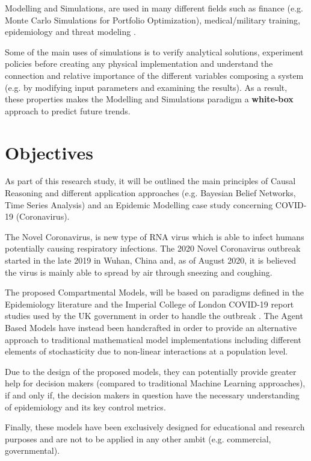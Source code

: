 Modelling and Simulations, are used in many different fields such as finance (e.g. Monte Carlo Simulations for Portfolio Optimization), medical/military training, epidemiology and threat modeling \cite{mod_2, mod_3}. 

Some of the main uses of simulations is to verify analytical solutions, experiment policies before creating any physical implementation and understand the connection and relative importance of the different variables composing a system (e.g. by modifying input parameters and examining the results). As a result, these properties makes the Modelling and Simulations paradigm a \textbf{white-box} approach to predict future trends.

\section{Objectives}
\vspace{-0.1cm}
As part of this research study, it will be outlined the main principles of Causal Reasoning and different application approaches (e.g. Bayesian Belief Networks, Time Series Analysis) and an Epidemic Modelling case study concerning COVID-19 (Coronavirus). 

The Novel Coronavirus, is new type of RNA virus which is able to infect humans potentially causing respiratory infections. The 2020 Novel Coronavirus outbreak started in the late 2019 in Wuhan, China and, as of August 2020, it is believed the virus is mainly able to spread by air through sneezing and coughing. 

The proposed Compartmental Models, will be based on paradigms defined in the Epidemiology literature \cite{adam_k} and the Imperial College of London COVID-19 report studies used by the UK government in order to handle the outbreak \cite{mod_4}. The Agent Based Models have instead been handcrafted in order to provide an alternative approach to traditional mathematical model implementations including different elements of stochasticity due to non-linear interactions at a population level. 

Due to the design of the proposed models, they can potentially provide greater help for decision makers (compared to traditional Machine Learning approaches), if and only if, the decision makers in question have the necessary understanding of epidemiology and its key control metrics. 

Finally, these models have been exclusively designed for educational and research purposes and are not to be applied in any other ambit (e.g. commercial, governmental).

